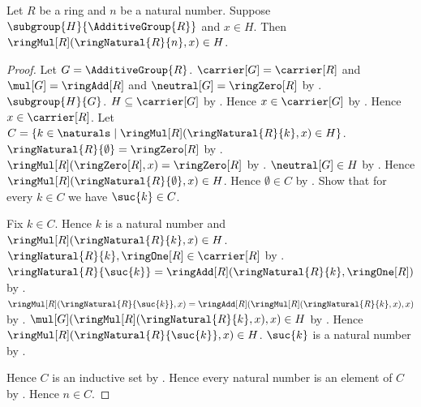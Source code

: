 \begin{lemma}\label{additive_subgroup_contains_natural_multiple}
    Let $R$ be a ring and $n$ be a natural number.
    Suppose $\subgroup{H}{\AdditiveGroup{R}}$ and $x\in H$.
    Then $\ringMul[R](\ringNatural{R}{n},x)\in H$.
\end{lemma}
\begin{proof}
    Let $G=\AdditiveGroup{R}$.
    $\carrier[G]=\carrier[R]$ and $\mul[G]=\ringAdd[R]$ and
        $\neutral[G]=\ringZero[R]$ by
        .
    $\subgroup{H}{G}$.
    $H\subseteq\carrier[G]$ by .
    Hence $x\in\carrier[G]$ by .
    Hence $x\in\carrier[R]$.
    Let $C=\{k\in\naturals\mid
        \ringMul[R](\ringNatural{R}{k},x)\in H\}$.
    $\ringNatural{R}{\emptyset}=\ringZero[R]$ by
        .
    $\ringMul[R](\ringZero[R],x)=\ringZero[R]$ by
        .
    $\neutral[G]\in H$ by .
    Hence $\ringMul[R](\ringNatural{R}{\emptyset},x)\in H$.
    Hence $\emptyset\in C$ by .
    Show that for every $k\in C$ we have $\suc{k}\in C$.
    \begin{subproof}
        Fix $k\in C$.
        Hence $k$ is a natural number and
            $\ringMul[R](\ringNatural{R}{k},x)\in H$.
        $\ringNatural{R}{k},\ringOne[R]\in\carrier[R]$ by
            .
        $\ringNatural{R}{\suc{k}}
            =\ringAdd[R](\ringNatural{R}{k},\ringOne[R])$ by
            .
        $\ringMul[R](\ringNatural{R}{\suc{k}},x)
            =\ringAdd[R](\ringMul[R](\ringNatural{R}{k},x),x)$ by
            .
        $\mul[G](\ringMul[R](\ringNatural{R}{k},x),x)\in H$ by
            .
        Hence $\ringMul[R](\ringNatural{R}{\suc{k}},x)\in H$.
        $\suc{k}$ is a natural number by .
    \end{subproof}
    Hence $C$ is an inductive set by .
    Hence every natural number is an element of $C$ by
        .
    Hence $n\in C$.
\end{proof}

